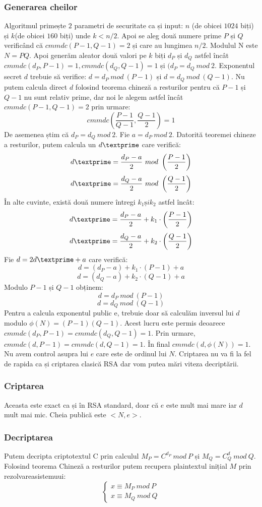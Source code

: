 \documentclass[12]{report}
\begin{document}
	    \subsubsection{Generarea cheilor}
	    Algoritmul primește $2$ parametri de securitate ca și input: $n$ (de obicei $1024$ biți) și $k$(de obicei $160$ biți) unde $k<n/2$. Apoi se aleg două numere prime $P$ și $Q$ verificând că $cmmdc(P-1,Q-1)=2$ și care au lungimea $n/2$. Modulul N este $N=PQ$. Apoi generăm aleator două valori pe $k$ biți $d_P$ și $d_Q$ astfel încât $cmmdc(d_P,P-1)=1, cmmdc(d_Q,Q-1)=1$ și $(d_P=d_Q \ mod \ 2$. Exponentul secret $d$ trebuie să verifice: $d=d_P \ mod \ (P-1)$ și $d=d_Q \ mod \ (Q-1)$. Nu putem calcula direct $d$ folosind teorema chineză a resturilor pentru că $P-1$ și $Q-1$ nu sunt relativ prime, dar noi le alegem astfel încât $cmmdc(P-1,Q-1)=2$ prin urmare:
	    $$cmmdc \left( \frac{P-1}{Q-1},\frac{Q-1}{2}  \right)=1  $$
	     De asemenea știm că $ d_P=d_Q \ mod \ 2$. Fie $ a=d_P \ mod \ 2 $. Datorită teoremei chineze a resturilor, putem calcula un $d\textprime$ care verifică:
	    $$d\textprime = \frac{d_P-a}{2} \ mod \ \left( \frac{P-1}{2} \right) $$
	    $$d\textprime = \frac{d_Q-a}{2} \ mod \ \left( \frac{Q-1}{2} \right) $$
	    În alte cuvinte, există două numere întregi $k_1 și k_2$ astfel încât: 
	    $$d\textprime = \frac{d_P-a}{2} + k_1 \cdot   \left( \frac{P-1}{2} \right) $$
	    $$d\textprime = \frac{d_Q-a}{2} + k_2 \cdot   \left( \frac{Q-1}{2} \right) $$
	    Fie $ d=2d\textprime +a$ care verifică:
	    $$ d=(d_P-a) + k_1 \cdot   (P-1) +a$$
	    $$ d=(d_Q-a) + k_2 \cdot   (Q-1) +a$$
	    Modulo $P-1$ și $Q-1$ obținem:
	    $$d=d_P \ mod \ \left( P-1 \right)$$
	    $$d=d_Q \ mod \ \left( Q-1 \right)$$
	    Pentru a calcula exponentul public e, trebuie doar să calculăm inversul lui $d$ modulo $\phi(N)=(P-1)(Q-1)$. Acest lucru este permis deoarece $cmmdc(d_P,P-1)=cmmdc(d_Q,Q-1)=1$. Prin urmare, $cmmdc(d,P-1)=cmmdc(d,Q-1)=1$. În final $cmmdc(d,\phi(N))=1$. Nu avem control asupra lui $e$ care este de ordinul lui $N$. Criptarea nu va fi la fel de rapida ca și criptarea clasică RSA dar vom putea mări viteza decriptării.
	   \subsubsection{Criptarea}
	    Aceasta este exact ca și în RSA standard, doar că $e$ este mult mai mare iar $d$ mult mai mic. Cheia publică este $<N,e>$.
	    \subsubsection{Decriptarea}
	    Putem decripta criptotextul C prin calculul $M_P = C^{d_P} \ mod \ P$ și $M_Q=C^d_Q  \ mod \ Q$. Folosind teorema Chineză a resturilor putem recupera plaintextul inițial $M$ prin rezolvareasistemuui:
	    \[
\begin{cases}
x \equiv M_P \ mod \ P  \\
x \equiv M_Q \ mod \ Q
\end{cases}
\]
	    
\end{document}

